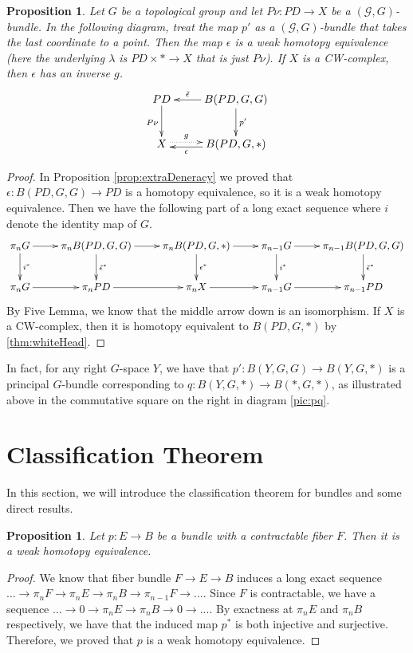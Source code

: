 \documentclass[psamsfonts]{amsart}
\newtheorem{prop}[thm]{Proposition}
\theoremstyle{definition}
\theoremstyle{remark}
\numberwithin{equation}{section}
\begin{document}
\begin{prop}
\label{prop:pq}
Let $G$ be a topological group and let $P\nu: PD \rightarrow X$ be a $(\mathcal{G}, G)$-bundle. In the following diagram, treat the map $p'$ as a $(\mathcal{G}, G)$-bundle that takes the last coordinate to a point. Then the map $\epsilon$ is a weak homotopy equivalence (here the underlying $\lambda$ is $PD \times * \to X$ that is just $P\nu$). If $X$ is a CW-complex, then $\epsilon$ has an inverse $g$. 
\[\xymatrix{
PD \ar[d]_{P\nu} & B(PD, G, G) \ar[l]_-{\tilde{\epsilon}} \ar[d]^{p'}\\
X \ar@{.>}[r]<.5ex>^-{g} & B(PD, G, *) \ar[l]<.5ex>^-{\epsilon} \\} \]
\end{prop}

\begin{proof}
In Proposition \ref{prop:extraDeneracy} we proved that $\epsilon: B(PD, G, G) \to PD$ is a homotopy equivalence, so it is a weak homotopy equivalence. Then we have the following part of a long exact sequence where $i$ denote the identity map of $G$. 
\[\xymatrix{
\pi_{n}G \ar[d]^-{i^{*}} \ar[r] & \pi_{n}B(PD, G, G) \ar[d]^-{\tilde{\epsilon}^{*}} \ar[r]& \pi_{n}B(PD, G, *) \ar[d]^{\epsilon^{*}} \ar[r] & \pi_{n - 1}G \ar[r] \ar[d]^-{i^{*}} & \pi_{n - 1}B(PD, G, G) \ar[d]^-{\tilde{\epsilon}^{*}}\\
\pi_{n}G \ar[r] & \pi_{n}PD \ar[r] & \pi_{n}X \ar[r] & \pi_{n - 1}G \ar[r] & \pi_{n - 1}PD\\} \]
By Five Lemma, we know that the middle arrow down is an isomorphism. If $X$ is a CW-complex, then it is homotopy equivalent to $B(PD, G, *)$ by \ref{thm:whiteHead}.
\end{proof}

In fact, for any right $G$-space $Y$, we have that $p': B(Y, G, G) \rightarrow B(Y, G, *)$ is a principal $G$-bundle corresponding to $q: B(Y, G, *) \rightarrow B(*, G, *)$, as illustrated above in the commutative square on the right in diagram \ref{pic:pq}.


\section{Classification Theorem}
\label{sec:class}
In this section, we will introduce the classification theorem for bundles and some direct results.

\begin{prop}
\label{prop: contractable}
Let $p: E \to B$ be a bundle with a contractable fiber $F$. Then it is a weak homotopy equivalence. 
\end{prop}
\begin{proof}
We know that fiber bundle $F \to E \to B$ induces a long exact sequence $... \to \pi_{n}F \to \pi_{n}E \to \pi_{n}B \to \pi_{n - 1}F \to...$. Since $F$ is contractable, we have a sequence $... \to 0 \to \pi_{n}E \to \pi_{n}B \to 0 \to...$. By exactness at $\pi_{n}E$ and $\pi_{n}B$ respectively, we have that the induced map $p^{*}$ is both injective and surjective. Therefore, we proved that $p$ is a weak homotopy equivalence.
\end{proof}
\end{document}
